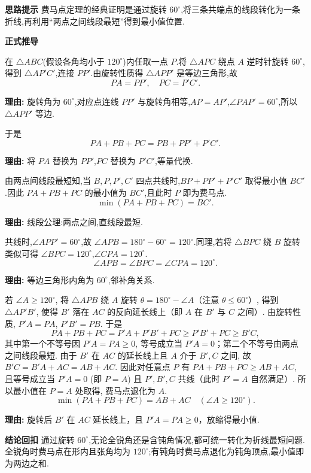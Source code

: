 \begin{proofbox}
	\textbf{\textcolor{CProof}{思路提示}}
	费马点定理的经典证明是通过旋转 $60^\circ$,将三条共端点的线段转化为一条折线,再利用“两点之间线段最短”得到最小值位置.

	\medskip
	\textbf{\textcolor{CProof}{正式推导}}
	\begin{description}[style=nextline, leftmargin=2.8em, labelsep=0.5em, itemsep=0.55em]
		\item[\textbf{步骤一(等边构造):}]
			在 $\triangle ABC$(假设各角均小于 $120^\circ$)内任取一点 $P$.将 $\triangle APC$ 绕点 $A$ 逆时针旋转 $60^\circ$,得到 $\triangle AP'C'$,连接 $PP'$.由旋转性质得 $\triangle APP'$ 是等边三角形,故
			\[
				PA = PP', \quad PC = P'C'.
			\]
			\par\textbf{理由:} 旋转角为 $60^\circ$,对应点连线 $PP'$ 与旋转角相等,$AP=AP'$,$\angle PAP'=60^\circ$,所以 $\triangle APP'$ 等边.
		\item[\textbf{步骤二(和式转化):}]
			于是
			\[
				PA+PB+PC = PB + PP' + P'C'.
			\]
			\par\textbf{理由:} 将 $PA$ 替换为 $PP'$,$PC$ 替换为 $P'C'$,等量代换.
		\item[\textbf{步骤三(共线最短):}]
			由两点间线段最短知,当 $B,P,P',C'$ 四点共线时,$BP+PP'+P'C'$ 取得最小值 $BC'$.因此 $PA+PB+PC$ 的最小值为 $BC'$,且此时 $P$ 即为费马点.
			\[
				\min(PA+PB+PC)=BC'.
			\]
			\par\textbf{理由:} 线段公理:两点之间,直线段最短.
		\item[\textbf{步骤四(角度确定):}]
			共线时,$\angle APP'=60^\circ$,故 $\angle APB=180^\circ-60^\circ=120^\circ$.同理,若将 $\triangle BPC$ 绕 $B$ 旋转类似可得 $\angle BPC=120^\circ$,$\angle CPA=120^\circ$.
			\[
				\angle APB = \angle BPC = \angle CPA = 120^\circ.
			\]
			\par\textbf{理由:} 等边三角形内角为 $60^\circ$,邻补角关系.
		\item[\textbf{步骤五(退化情况):}]
			若 $\angle A \ge 120^\circ$, 将 $\triangle APB$ 绕 $A$ 旋转 $\theta = 180^\circ - \angle A$（注意 $\theta \le 60^\circ$）, 得到 $\triangle AP'B'$, 使得 $B'$ 落在 $AC$ 的反向延长线上（即 $A$ 在 $B'$ 与 $C$ 之间）. 由旋转性质, $P'A = PA$, $P'B' = PB$. 于是
			\[
				PA + PB + PC = P'A + P'B' + PC \ge P'B' + PC \ge B'C,
			\]
			其中第一个不等号因 $P'A = PA \ge 0$, 等号成立当 $P'A = 0$；第二个不等号由两点之间线段最短. 由于 $B'$ 在 $AC$ 的延长线上且 $A$ 介于 $B',C$ 之间, 故 $B'C = B'A + AC = AB + AC$. 因此对任意点 $P$ 有 $PA+PB+PC \ge AB+AC$, 且等号成立当 $P'A=0$ (即 $P=A$) 且 $P',B',C$ 共线（此时 $P'=A$ 自然满足）. 所以最小值在 $P=A$ 处取得, 费马点退化为 $A$.
			\[
				\min(PA+PB+PC)=AB+AC \quad (\angle A \ge 120^\circ).
			\]
			\par\textbf{理由:} 旋转后 $B'$ 在 $AC$ 延长线上，且 $P'A=PA\ge0$，放缩得最小值.
	\end{description}

	\medskip
	\textbf{\textcolor{CProof}{结论回扣}}
	通过旋转 $60^\circ$,无论全锐角还是含钝角情况,都可统一转化为折线最短问题.全锐角时费马点在形内且张角均为 $120^\circ$;有钝角时费马点退化为钝角顶点,最小值即为两边之和.
\end{proofbox}
